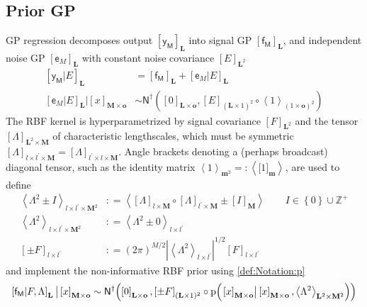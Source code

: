 \documentclass[preprint,12pt]{elsarticle}
\newcommand*{\M}[1]{\ensuremath{#1}\xspace}
\newcommand*{\x}{\times}
\newcommand*{\mi}[1]{\mathbf{#1}}
\newcommand*{\st}[1]{\mathbb{#1}}
\newcommand*{\rv}[1]{\mathsf{#1}}
\newcommand*{\te}[2][]{\left\lbrack{#2}\right\rbrack_{#1}}
\newcommand*{\tte}[2][]{\lbrack{#2}\rbrack_{#1}}
\newcommand*{\diag}[2][]{\left\langle{#2}\right\rangle_{#1}}
\newcommand*{\prob}[3]{\M{\mathrm{p}\!\left(\left.{#1}\right\vert{#2,#3}\right)}}
\newcommand*{\deq}{\M{\mathrel{\mathop:}=}}
\newcommand*{\deqr}{\M{=\mathrel{\mathop:}}}
\newcommand*{\gaussd}[2]{\mathsf{N}^{\dagger}\!\left({#1,#2}\right)}
\newcommand*{\modulus}[1]{\M{\left\lvert{#1}\right\rvert}}
\newcommand*{\set}[1]{\M{\left\lbrace{#1}\right\rbrace}}
\begin{document}
    \subsection{Prior GP} \label{sub:GPR:Prior}
        GP regression decomposes output $\te[\mi{L}]{\rv{y_M}}$ into signal GP $\te[\mi{L}]{\rv{f_M}}$, and independent noise GP $\te[\mi{L}]{\rv{e}_M}$ with constant noise covariance $\te[\mi{L}^2]{E}$
        \begin{equation*}
            \begin{aligned}
                \te[\mi{L}]{\rv{y_M}\vert E} 
                &= \te[\mi{L}]{\rv{f_M}} + \te[\mi{L}]{\rv{e}_M\vert E} \\
                \te[\mi{L}]{\rv{e}_M\vert E} \big\vert \te[\mi{M}\x\mi{o}]{x}
                &\sim \gaussd{\te[\mi{L}\x\mi{o}]{0}}{\te[(\mi{L}\x 1)^2]{E} \circ \diag[(1\x\mi{o})^2]{1}}
            \end{aligned}
        \end{equation*}
        The RBF kernel is hyperparametrized by signal covariance $\te[\mi{L}^2]{F}$ and the tensor $\te[\mi{L}^{2}\x\mi{M}]{\Lambda}$ of characteristic lengthscales, which must be symmetric $\te[l\x l^{\prime}\x\mi{M}]{\Lambda}=\te[l^{\prime}\x l\x\mi{M}]{\Lambda}$. 
        Angle brackets denoting a (perhaps broadcast) diagonal tensor, such as the identity matrix $\diag[\mi{m}^2]{1} \deqr \diag[]{\tte[\mi{m}]{1}}$, are used to define
        \begin{equation*}
            \begin{aligned}
                \diag[l\x l^{\prime}\x\mi{M}^{2}]{\Lambda^{2} \pm I} 
                &\deq \diag{\te[l\x\mi{M}]{\Lambda} \circ \te[l^{\prime}\x\mi{M}]{\Lambda} \pm \te[\mi{M}]{I}} 
                \qquad I \in \set{0}\cup\st{Z}^{+} \\
                \diag[l\x l^{\prime}\x\mi{M}^{2}]{\Lambda^{2}} &\deq 
                \diag[l\x l^{\prime}]{\Lambda^{2} \pm 0} \\
                    \te[l\x l^{\prime}]{\pm F} 
                &\deq (2 \pi)^{M/2} \modulus{\diag[l\x l^{\prime}]{\Lambda^{2}}}^{1/2} \te[l\x l^{\prime}]{F}
            \end{aligned}
        \end{equation*}
        and implement the non-informative RBF prior using \cref{def:Notation:p}
        \begin{equation*}
            \te[\mi{L}]{\rv{f_M} \vert F,\Lambda}
            \big\vert \te[\mi{M}\x\mi{o}]{x} \sim \\
            \gaussd{\te[\mi{L}\x\mi{o}]{0}}{\te[(\mi{L}\x 1)^{2}]{\pm F} \circ 
            \prob{\te[\mi{M}\x\mi{o}]{x}}{\te[\mi{M}\x\mi{o}]{x}}
            {\diag[\mi{L}^{2}\x\mi{M}^{2}]{\Lambda^{2}}}} 
        \end{equation*}
        
\end{document}
